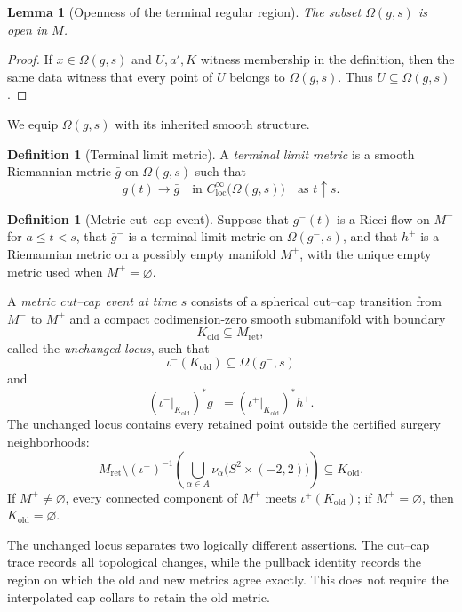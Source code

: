 \documentclass[10pt]{coll-l}
\newtheorem{lemma}[theorem]{Lemma}
\theoremstyle{definition}
\newtheorem{definition}[theorem]{Definition}
\theoremstyle{remark}
\numberwithin{section}{chapter}
\numberwithin{equation}{chapter}
\begin{document}
\begin{lemma}[Openness of the terminal regular region]
\label{lem:terminal-regular-region-open}
The subset $\Omega(g,s)$ is open in $M$.
\end{lemma}

\begin{proof}
If $x\in\Omega(g,s)$ and $U,a',K$ witness membership in the definition, then
the same data witness that every point of $U$ belongs to $\Omega(g,s)$.
Thus $U\subseteq\Omega(g,s)$.
\end{proof}

We equip $\Omega(g,s)$ with its inherited smooth structure.

\begin{definition}[Terminal limit metric]
\label{def:terminal-limit-metric}
A \emph{terminal limit metric} is a smooth Riemannian metric $\bar g$ on
$\Omega(g,s)$ such that
\[
  g(t)\longrightarrow\bar g
  \quad\text{in }C^{\infty}_{\mathrm{loc}}\bigl(\Omega(g,s)\bigr)
  \quad\text{as }t\uparrow s.
\]
\end{definition}

\begin{definition}[Metric cut--cap event]
\label{def:metric-cut-cap-event}
Suppose that $g^{-}(t)$ is a Ricci flow on $M^{-}$ for $a\leq t<s$, that
$\bar g^{-}$ is a terminal limit metric on $\Omega(g^{-},s)$, and that
$h^{+}$ is a Riemannian metric on a possibly empty manifold $M^{+}$, with
the unique empty metric used when $M^{+}=\varnothing$.

A \emph{metric cut--cap event at time $s$} consists of a spherical cut--cap
transition from $M^{-}$ to $M^{+}$ and a compact codimension-zero smooth
submanifold with boundary
\[
  K_{\mathrm{old}}\subseteq M_{\mathrm{ret}},
\]
called the \emph{unchanged locus}, such that
\[
  \iota^{-}(K_{\mathrm{old}})\subseteq\Omega(g^{-},s)
\]
and
\[
  (\iota^{-}|_{K_{\mathrm{old}}})^{*}\bar g^{-}
  =
  (\iota^{+}|_{K_{\mathrm{old}}})^{*}h^{+}.
\]
The unchanged locus contains every retained point outside the certified
surgery neighborhoods:
\[
  M_{\mathrm{ret}}\setminus
  (\iota^{-})^{-1}\!\left(
    \bigcup_{\alpha\in A}
    \nu_{\alpha}\bigl(S^{2}\times(-2,2)\bigr)
  \right)
  \subseteq K_{\mathrm{old}}.
\]
If $M^{+}\neq\varnothing$, every connected component of $M^{+}$ meets
$\iota^{+}(K_{\mathrm{old}})$; if $M^{+}=\varnothing$, then
$K_{\mathrm{old}}=\varnothing$.
\end{definition}

The unchanged locus separates two logically different assertions.  The
cut--cap trace records all topological changes, while the pullback identity
records the region on which the old and new metrics agree exactly.  This does
not require the interpolated cap collars to retain the old metric.
\end{document}
